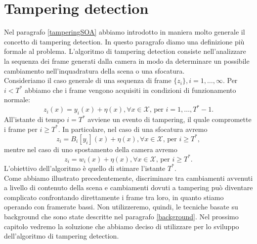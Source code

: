 \section{Tampering detection}
Nel paragrafo \ref{tamperingSOA} abbiamo introdotto in maniera molto generale il concetto di tampering detection. 
In questo paragrafo diamo una definizione pi\`u formale al problema.
L'algoritmo di tampering detection consiste nell'analizzare la sequenza dei frame generati dalla camera in modo da determinare un possibile cambiamento nell'inquadratura della scena o una sfocatura.\\
Consideriamo il caso generale di una sequenza di frame $\{z_i\}, i=1,\dots,\infty$. 
Per $i<T^*$ abbiamo che i frame vengono acquisiti in condizioni di funzionamento normale:
\[ z_i(x)=y_i(x) + \eta(x), \forall x \in \mathcal{X} \mbox{, per } i=1,\dots , T^*-1. \] 
All'istante di tempo $i = T^*$ avviene un evento di tampering, il quale compromette i frame per $i\geq T^*$.  
In particolare, nel caso di una sfocatura avremo
\[ z_i = B_i[y_i](x) + \eta(x), \forall x \in \mathcal{X} \mbox{, per } i \geq T^*,\]
mentre nel caso di uno spostamento della camera avremo
\[ z_i = w_i(x) + \eta(x), \forall x \in \mathcal{X} \mbox{, per } i \geq T^*. \]
L'obiettivo dell'algoritmo \`e quello di stimare l'istante $T^*$. \\
Come abbiamo illustrato precedentemente, discriminare tra cambiamenti avvenuti a livello di contenuto della scena e cambiamenti dovuti a tampering pu\`o diventare complicato confrontando direttamente i frame tra loro, in quanto stiamo operando con framerate bassi.
Non utilizzeremo, quindi, le tecniche basate su background che sono state descritte nel paragrafo \ref{background}.
Nel prossimo capitolo vedremo la soluzione che abbiamo deciso di utilizzare per lo sviluppo dell'algoritmo di tampering detection. 